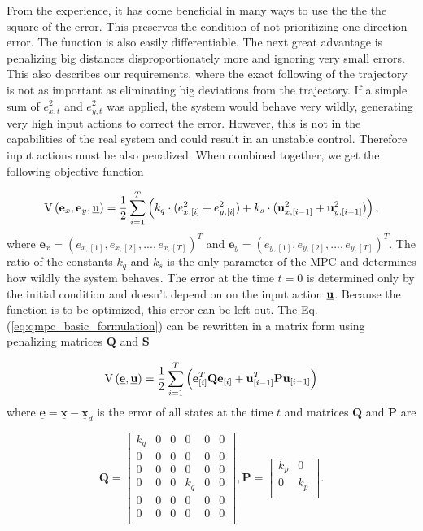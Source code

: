\documentclass[a4paper,11pt,titlepage]{article}
\newcommand{\uvec}{\textbf{\underline{u}}}
\begin{document}
From the experience, it has come beneficial in many ways to use the the the square of the error. This preserves the condition of not prioritizing one direction error. The function is also easily differentiable. The next great advantage is penalizing big distances disproportionately more and ignoring very small errors. This also describes our requirements, where the exact following of the trajectory is not as important as eliminating big deviations from the trajectory. If a simple sum of $e_{x, t}^2$ and $e_{y, t}^2$ was applied, the system would behave very wildly, generating very high input actions to correct the error. However, this is not in the capabilities of the real system and could result in an unstable control. Therefore input actions must be also penalized. When combined together, we get the following objective function 

\begin{equation}
\label{eq:qmpc_basic_formulation}
\mathrm{V}\left(\textbf{e}_x, \textbf{e}_y, \uvec\right) 
= \frac{1}{2}\sum_{i=1}^{T}\left( k_q \cdot (e^2_{x, [i]}+e^2_{y, [i]}) + k_s \cdot (\textbf{u}^2_{x, [i-1]}+\textbf{u}^2_{y, [i-1]})\right),
\end{equation}
where $\textbf{e}_x = (e_{x, [1]}, e_{x, [2]}, ..., e_{x, [T]})^T$ and $\textbf{e}_y = (e_{y, [1]}, e_{y, [2]}, ..., e_{y, [T]})^T$. The ratio of the constants $k_q$ and $k_s$ is the only parameter of the MPC and determines how wildly the system behaves. The error at the time $t = 0$ is determined only by the initial condition and doesn't depend on on the input action $\uvec$. Because the function is to be optimized, this error can be left out. The Eq. (\ref{eq:qmpc_basic_formulation}) can be rewritten in a matrix form using penalizing matrices $\textbf{Q}$ and $\textbf{S}$

\begin{equation}
\label{eq:qmpc_sum}
\mathrm{V}\left(\textbf{\underline{e}}, \uvec\right) = \frac{1}{2}\sum_{i=1}^{T}\left(\textbf{e}^T_{[i]}\textbf{Q}\textbf{e}_{[i]} + \textbf{u}^T_{[i-1]}\textbf{P}\textbf{u}_{[i-1]}\right)
\end{equation}
where $\underline{\textbf{e}} = \underline{\textbf{x}} - \underline{\textbf{x}}_d$ is the error of all states at the time $t$  and matrices $\textbf{Q}$ and $\textbf{P}$ are

\begin{equation}
\label{eq:qmpc_weighting_matrices_simple}
\textbf{Q} = \begin{bmatrix}
k_q & 0 & 0 & 0 & 0 & 0 \\
0 & 0 & 0 & 0 & 0 & 0 \\
0 & 0 & 0 & 0 & 0 & 0 \\
0 & 0 & 0 & k_q & 0 & 0 \\
0 & 0 & 0 & 0 & 0 & 0 \\
0 & 0 & 0 & 0 & 0 & 0 \\
\end{bmatrix}, 
\textbf{P} = \begin{bmatrix}
k_p & 0\\
0 & k_p\\
\end{bmatrix}.
\end{equation}
\end{document}
